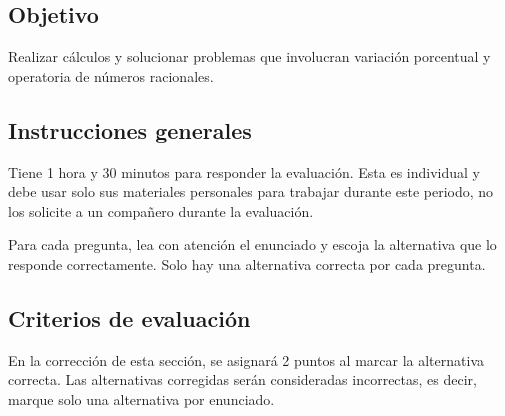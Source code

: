 \documentclass[]{srs}
\begin{document}
\subsection*{Objetivo}
Realizar cálculos y solucionar problemas que involucran variación porcentual y
operatoria de números racionales.

\subsection*{Instrucciones generales}
Tiene 1 hora y 30 minutos para responder la evaluación. Esta es individual y debe
usar solo sus materiales personales para trabajar durante este periodo, no los solicite
a un compañero durante la evaluación.

Para cada pregunta, lea con atención el enunciado y escoja la alternativa que lo
responde correctamente. Solo hay una alternativa correcta por cada pregunta.

\subsection*{Criterios de evaluación}
En la corrección de esta sección, se asignará 2 puntos al marcar la alternativa correcta.
Las alternativas corregidas serán consideradas incorrectas, es decir, marque solo una
alternativa por enunciado.

\separador[2mm]
\end{document}
